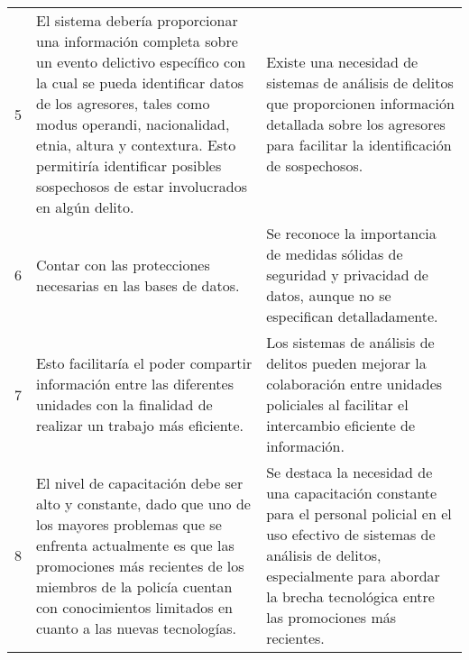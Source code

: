 \begin{longtable}{|l|p{6cm}|p{6cm}|}
    5                                                 & El sistema debería proporcionar una información completa sobre un evento delictivo específico con la cual se pueda identificar datos de los agresores, tales como modus operandi, nacionalidad, etnia, altura y contextura. Esto permitiría identificar posibles sospechosos de estar involucrados en algún delito.                                                                              & Existe una necesidad de sistemas de análisis de delitos que proporcionen información detallada sobre los agresores para facilitar la identificación de sospechosos.                                                          \\
    6                                                 & Contar con las protecciones necesarias en las bases de datos.                                                                                                                                                                                                                                                                                                                                    & Se reconoce la importancia de medidas sólidas de seguridad y privacidad de datos, aunque no se especifican detalladamente.                                                                                                   \\
    7                                                 & Esto facilitaría el poder compartir información entre las diferentes unidades con la finalidad de realizar un trabajo más eficiente.                                                                                                                                                                                                                                                             & Los sistemas de análisis de delitos pueden mejorar la colaboración entre unidades policiales al facilitar el intercambio eficiente de información.                                                                           \\
    8                                                 & El nivel de capacitación debe ser alto y constante, dado que uno de los mayores problemas que se enfrenta actualmente es que las promociones más recientes de los miembros de la policía cuentan con conocimientos limitados en cuanto a las nuevas tecnologías.                                                                                                                                 & Se destaca la necesidad de una capacitación constante para el personal policial en el uso efectivo de sistemas de análisis de delitos, especialmente para abordar la brecha tecnológica entre las promociones más recientes. \\
\end{longtable}
